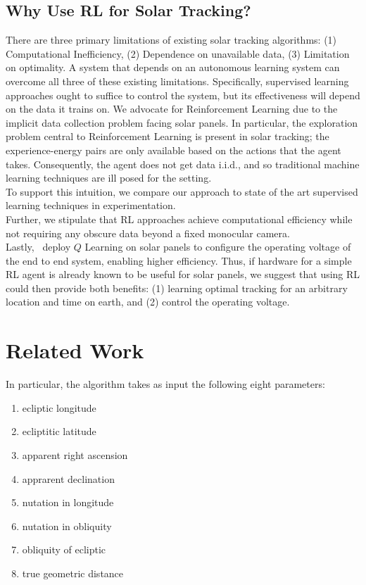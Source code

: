 \documentclass[11pt]{article}
\begin{document}
\subsection{Why Use RL for Solar Tracking?}

There are three primary limitations of existing solar tracking algorithms: (1) Computational Inefficiency, (2) Dependence on unavailable data, (3) Limitation on optimality. A system that depends on an autonomous learning system can overcome all three of these existing limitations. Specifically, supervised learning approaches ought to suffice to control the system, but its effectiveness will depend on the data it trains on. We advocate for Reinforcement Learning due to the implicit data collection problem facing solar panels. In particular, the exploration problem central to Reinforcement Learning is present in solar tracking; the experience-energy pairs are only available based on the actions that the agent takes. Consequently, the agent does not get data i.i.d., and so traditional machine learning techniques are ill posed for the setting. \\

To support this intuition, we compare our approach to state of the art supervised learning techniques in experimentation. \\

Further, we stipulate that RL approaches achieve computational efficiency while not requiring any obscure data beyond a fixed monocular camera. \\

Lastly,~\citet{Hsu2015} deploy $Q$ Learning on solar panels to configure the operating voltage of the end to end system, enabling higher efficiency. Thus, if hardware for a simple RL agent is already known to be useful for solar panels, we suggest that using RL could then provide both benefits: (1) learning optimal tracking for an arbitrary location and time on earth, and (2) control the operating voltage. \\



\section{Related Work}


In particular, the algorithm takes as input the following eight parameters:
\begin{enumerate}
\item ecliptic longitude
\item ecliptitic latitude
\item apparent right ascension
\item apprarent declination
\item nutation in longitude
\item nutation in obliquity
\item obliquity of ecliptic
\item true geometric distance
\end{enumerate}
\end{document}
